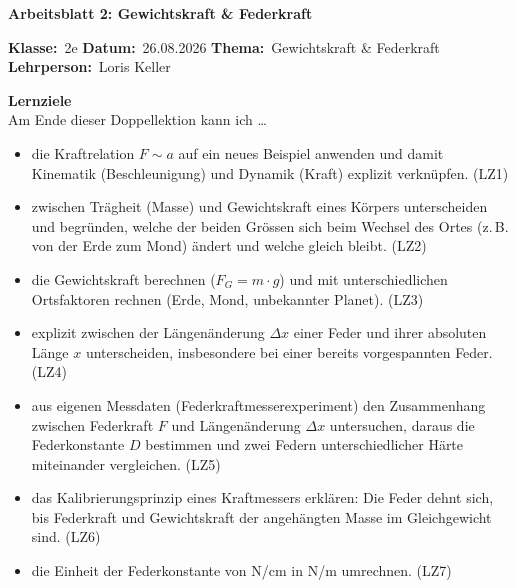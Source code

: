 \documentclass[addpoints,11pt,a4paper]{exam}
\newenvironment{infobox}{%
  \par\addvspace{10pt}\noindent
}{%
  \par\addvspace{10pt}
}
\newcommand{\Kopfzeile}[4]{%
  \begin{titlebox}
    {\color{white}\sffamily\bfseries\Large #4}
  \end{titlebox}
  \vspace{0.5em}
  \noindent\textbf{Klasse:}~#1 \hfill \textbf{Datum:}~#2 \hfill \textbf{Thema:}~#3
    \hfill \textbf{Lehrperson:}~Loris Keller
  \vspace{0.8em}
  \lhead{\textcolor{darkgray}{#3}}
  \rhead{\textcolor{darkgray}{#4}}
}
\newcommand{\Klasse}{2e}
\newcommand{\Datum}{26.08.2026}
\newcommand{\Thema}{Gewichtskraft \& Federkraft}
\newcommand{\ArbeitsblattTitel}{Arbeitsblatt 2: Gewichtskraft \& Federkraft}
\begin{document}
\Kopfzeile{\Klasse}{\Datum}{\Thema}{\ArbeitsblattTitel}

\begin{infobox}
\textbf{Lernziele}\\
Am Ende dieser Doppellektion kann ich \dots
\begin{itemize}[leftmargin=1.2cm,itemsep=0.3em]
  \item die Kraftrelation $F\sim a$ auf ein neues Beispiel anwenden und damit Kinematik (Beschleunigung) und Dynamik (Kraft) explizit verknüpfen. (LZ1)
  \item zwischen Trägheit (Masse) und Gewichtskraft eines Körpers unterscheiden und begründen, welche der beiden Grössen sich beim Wechsel des Ortes (z.\,B. von der Erde zum Mond) ändert und welche gleich bleibt. (LZ2)
  \item die Gewichtskraft berechnen ($F_G=m\cdot g$) und mit unterschiedlichen Ortsfaktoren rechnen (Erde, Mond, unbekannter Planet). (LZ3)
  \item explizit zwischen der Längenänderung $\Delta x$ einer Feder und ihrer absoluten Länge $x$ unterscheiden, insbesondere bei einer bereits vorgespannten Feder. (LZ4)
  \item aus eigenen Messdaten (Federkraftmesserexperiment) den Zusammenhang zwischen Federkraft $F$ und Längenänderung $\Delta x$ untersuchen, daraus die Federkonstante $D$ bestimmen und zwei Federn unterschiedlicher Härte miteinander vergleichen. (LZ5)
  \item das Kalibrierungsprinzip eines Kraftmessers erklären: Die Feder dehnt sich, bis Federkraft und Gewichtskraft der angehängten Masse im Gleichgewicht sind. (LZ6)
  \item die Einheit der Federkonstante von N/cm in N/m umrechnen. (LZ7)
\end{itemize}
\end{infobox}
\end{document}

